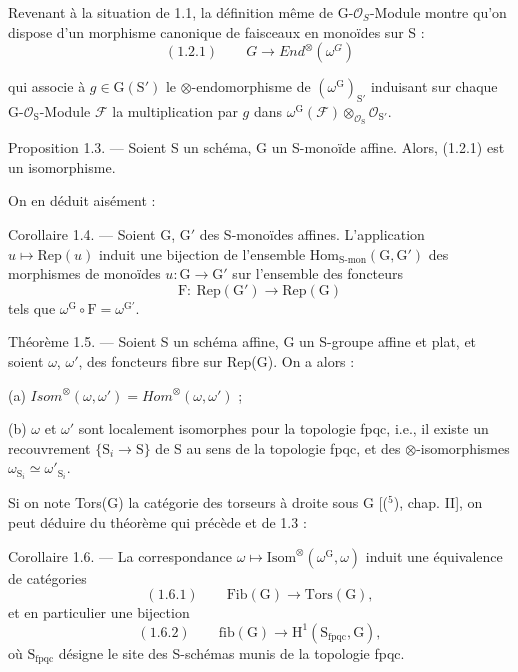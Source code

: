 \documentclass[11pt]{article}
\newcommand{\scanpage}[1]{\par\bigskip\noindent{\small\sffamily[scan #1]}\par}
\newcommand{\mspage}[1]{{\small\sffamily[p.\,#1]}}
\newcommand{\hand}[1]{\textcolor{blue}{#1}}
\begin{document}
Revenant à la situation de 1.1, la définition même de G-$\mathcal{O}_S$-Module
montre qu'on dispose d'un morphisme canonique de faisceaux en monoïdes
sur S :
\[ (1.2.1) \qquad G \to End^{\otimes}(\omega^G) \]

\mspage{\hand{69}}

\clearpage
\scanpage{119/70}
\mspage{( 2 )}

qui associe à $g\in \mathrm{G}(\mathrm{S}')$ le $\otimes$-endomorphisme de $(\omega^{\mathrm{G}})_{\mathrm{S}'}$ induisant sur chaque
G-$\mathcal{O}_{\mathrm{S}}$-Module $\mathcal{F}$ la multiplication par $g$ dans $\omega^{\mathrm{G}}(\mathcal{F})\otimes_{\mathcal{O}_{\mathrm{S}}}\mathcal{O}_{\mathrm{S}'}$.

Proposition 1.3. --- Soient S un schéma, G un S-monoïde affine. Alors,
(1.2.1) est un isomorphisme.

On en déduit aisément :

Corollaire 1.4. --- Soient G, G$'$ des S-monoïdes affines. L'application
$u\mapsto \mathrm{Rep}(u)$ induit une bijection de l'ensemble $\mathrm{Hom}_{\text{S-mon}}(\mathrm{G},\mathrm{G}')$ des
morphismes de monoïdes $u:\mathrm{G}\to\mathrm{G}'$ sur l'ensemble des foncteurs
\[ \mathrm{F}:\ \mathrm{Rep}(\mathrm{G}')\to\mathrm{Rep}(\mathrm{G}) \]
tels que $\omega^{\mathrm{G}}\circ\mathrm{F}=\omega^{\mathrm{G}'}$.

Théorème 1.5. --- Soient S un schéma affine, G un S-groupe affine et plat,
et soient $\omega$, $\omega'$, des foncteurs fibre sur Rep(G). On a alors :

(a) $\mathit{Isom}^{\otimes}(\omega,\omega')=\mathit{Hom}^{\otimes}(\omega,\omega')$ ;

(b) $\omega$ et $\omega'$ sont localement isomorphes pour la topologie fpqc, i.e., il
existe un recouvrement $\{\mathrm{S}_i\to\mathrm{S}\}$ de S au sens de la topologie fpqc, et des
$\otimes$-isomorphismes $\omega_{\mathrm{S}_i}\simeq\omega'_{\mathrm{S}_i}$.

Si on note Tors(G) la catégorie des torseurs à droite sous G [($^5$), chap. II],
on peut déduire du théorème qui précède et de 1.3 :

Corollaire 1.6. --- La correspondance $\omega\mapsto\mathrm{Isom}^{\otimes}(\omega^{\mathrm{G}},\omega)$ induit une
équivalence de catégories
\[ (1.6.1)\qquad \mathrm{Fib}(\mathrm{G})\to\mathrm{Tors}(\mathrm{G}), \]
et en particulier une bijection
\[ (1.6.2)\qquad \mathrm{fib}(\mathrm{G})\to\mathrm{H}^1(\mathrm{S}_{\mathrm{fpqc}},\mathrm{G}), \]
où $\mathrm{S}_{\mathrm{fpqc}}$ désigne le site des S-schémas munis de la topologie fpqc.
\end{document}
